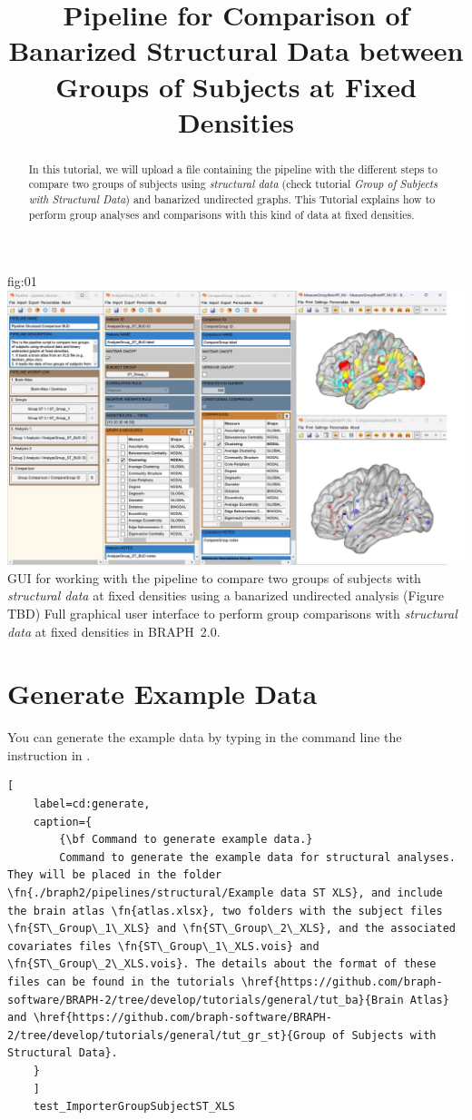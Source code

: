 \documentclass[justified]{tufte-handout}
\title{Pipeline for Comparison of Banarized Structural Data between Groups of Subjects at Fixed Densities}
\begin{document}
\maketitle

\begin{abstract}
\noindent
In this tutorial, we will upload a file containing the pipeline with the different steps to compare two groups of subjects using \emph{structural data} (check tutorial \emph{Group of Subjects with Structural Data}) and banarized undirected graphs. This Tutorial explains how to perform group analyses and comparisons with this kind of data at fixed densities.
\end{abstract}

\tableofcontents

	{fig:01}
	{\includegraphics{fig01.jpg}}
	{GUI for working with the pipeline to compare two groups of subjects with \emph{structural data} at fixed densities using a banarized undirected analysis (Figure TBD)}
	{
	Full graphical user interface to perform group comparisons with \emph{structural data} at fixed densities in BRAPH~2.0. 
	}

\clearpage

\section{Generate Example Data}

You can generate the example data by typing in the command line the instruction in .
%
\begin{lstlisting}[
	label=cd:generate,
	caption={
		{\bf Command to generate example data.}
		Command to generate the example data for structural analyses. They will be placed in the folder \fn{./braph2/pipelines/structural/Example data ST XLS}, and include the brain atlas \fn{atlas.xlsx}, two folders with the subject files \fn{ST\_Group\_1\_XLS} and \fn{ST\_Group\_2\_XLS}, and the associated covariates files \fn{ST\_Group\_1\_XLS.vois} and \fn{ST\_Group\_2\_XLS.vois}. The details about the format of these files can be found in the tutorials \href{https://github.com/braph-software/BRAPH-2/tree/develop/tutorials/general/tut_ba}{Brain Atlas} and \href{https://github.com/braph-software/BRAPH-2/tree/develop/tutorials/general/tut_gr_st}{Group of Subjects with Structural Data}.
	}
	]
	test_ImporterGroupSubjectST_XLS
\end{lstlisting}
\end{document}
